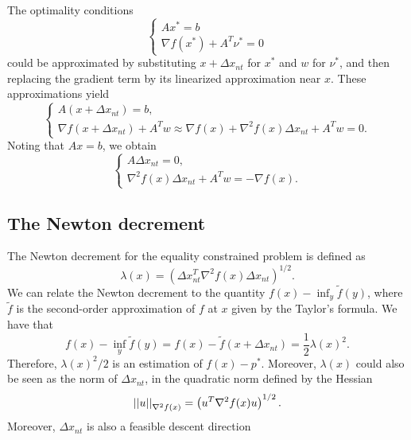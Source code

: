\documentclass[12pt]{article}
\begin{document}
The optimality conditions
\[\begin{cases}
    Ax^\ast=b\\
    \nabla f\left(x^\ast\right)+A^T\nu^\ast=0
\end{cases}\]
could be approximated by substituting \(x+\Delta x_{nt}\) for \(x^\ast\) and \(w\) for \(\nu^\ast\), and then replacing the gradient term by its linearized approximation near \(x\). These approximations yield
\[\begin{cases}
    A\left(x+\Delta x_{nt}\right)=b,\\
    \nabla f\left(x+\Delta x_{nt}\right)+A^Tw\approx\nabla f(x)+\nabla^2f(x)\Delta x_{nt}+A^Tw=0.
\end{cases}\]
Noting that \(Ax=b\), we obtain
\[\begin{cases}
    A\Delta x_{nt}=0,\\
    \nabla^2f(x)\Delta x_{nt}+A^Tw=-\nabla f(x).
\end{cases}\]

\subsection{The Newton decrement}

The Newton decrement for the equality constrained problem is defined as
\[\lambda(x)=\left(\Delta x_{nt}^T\nabla^2f(x)\Delta x_{nt}\right)^{1/2}.\]
We can relate the Newton decrement to the quantity \(f(x)-\inf_y\tilde f(y)\), where \(\tilde f\) is the second-order approximation of \(f\) at \(x\) given by the Taylor's formula. We have that
\[f(x)-\inf_y\tilde f(y)=f(x)-\tilde f\left(x+\Delta x_{nt}\right)=\frac12\lambda(x)^2.\]
Therefore, \(\lambda(x)^2/2\) is an estimation of \(f(x)-p^\ast\). Moreover, \(\lambda(x)\) could also be seen as the norm of \(\Delta x_{nt}\), in the quadratic norm defined by the Hessian
\[\left|\left|u\right|\right|_{\nabla^2f(x)}=\left(u^T\nabla^2f(x)u\right)^{1/2}.\]
Moreover, \(\Delta x_{nt}\) is also a feasible descent direction
\end{document}
